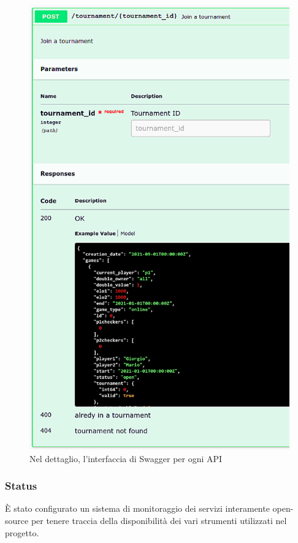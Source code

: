 \documentclass{article}
\begin{document}
\begin{figure}[H]
\begin{minipage}[t]{0.49\textwidth}
        \includegraphics[width=\textwidth]{report-sw_joinTournament}
        \caption{Nel dettaglio, l'interfaccia di Swagger per ogni API}
        \label{fig:sw_joinTournament}
    \end{minipage}    
\end{figure}


\subsubsection{Status}
\label{sec:status}
È stato configurato un sistema di monitoraggio dei servizi interamente open-source per tenere traccia della disponibilità 
dei vari strumenti utilizzati nel progetto.
\end{document}
